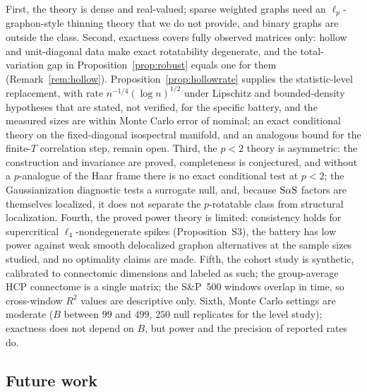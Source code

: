 First, the theory is dense and real-valued; sparse weighted graphs need an
$\ell_p$-graphon-style thinning theory \citep{borgs2019lp,caron2017sparse}
that we do not provide, and binary graphs are outside the class. Second, exactness covers fully observed matrices only: hollow and
unit-diagonal data make exact rotatability degenerate, and the
total-variation gap in Proposition~\ref{prop:robust} equals one for
them (Remark~\ref{rem:hollow}). Proposition~\ref{prop:hollowrate} supplies the statistic-level
replacement, with rate $n^{-1/4}(\log n)^{1/2}$ under Lipschitz and
bounded-density hypotheses that are stated, not verified, for the
specific battery, and the measured sizes are within Monte
Carlo error of nominal; an exact conditional theory on the
fixed-diagonal isospectral manifold, and an analogous bound for the
finite-$T$ correlation step, remain open.
Third, the $p<2$ theory is asymmetric: the construction and invariance are
proved, completeness is conjectured, and without a $p$-analogue of the
Haar frame there is no exact conditional test at $p<2$; the Gaussianization
diagnostic tests a surrogate null, and, because $\mathrm{S}\alpha\mathrm{S}$ factors are
themselves localized, it does not separate the $p$-rotatable class from
structural localization. Fourth, the proved power theory is limited:
consistency holds for supercritical $\ell_4$-nondegenerate spikes
(Proposition~S3), the battery has low power against weak
smooth delocalized graphon alternatives at the sample sizes studied, and
no optimality claims are made. Fifth, the cohort study is synthetic, calibrated to connectomic
dimensions and labeled as such; the group-average HCP connectome is a
single matrix; the S\&P~500 windows overlap in time, so cross-window
$R^2$ values are descriptive only. Sixth, Monte Carlo settings are
moderate ($B$ between $99$ and $499$, $250$ null replicates for the
level study); exactness does not depend on $B$, but power and the
precision of reported rates do.

\subsection{Future work}

